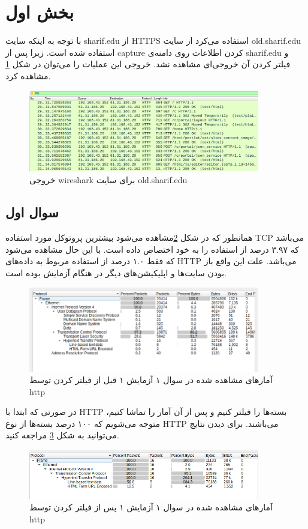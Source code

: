 \documentclass{article}
\begin{document}
\section{بخش اول}
با توجه به اینکه سایت sharif.edu از HTTPS استفاده می‌کرد از سایت old.sharif.edu استفاده شده است. زیرا پس از capture کردن اطلاعات روی دامنه‌ی sharif.edu و فیلتر کردن آن خروجی‌ای مشاهده نشد. خروجی این عملیات را می‌توان در شکل \ref{fig:result} مشاهده کرد.
\begin{figure}[h!]
	\centering
	\includegraphics[width=0.9\textwidth]{src/result.png}
	\caption{
خروجی wireshark برای سایت old.sharif.edu	
}
	\label{fig:result}
\end{figure}

\subsection{سوال اول}
همانطور که در شکل \ref{fig:stat}مشاهده می‌شود بیشترین پروتوکل مورد استفاده TCP می‌باشد که ۳.۹۷ درصد از استفاده را به خود اختصاص داده است. با این حال مشاهده می‌شود که فقط ۱.۰ درصد از استفاده مربوط به داده‌های HTTP می‌باشد. علت این واقع باز بودن سایت‌ها و اپلیکیشن‌های دیگر در هنگام آزمایش بوده است. 
\begin{figure}[h!]
	\centering
	\includegraphics[width=0.9\textwidth]{src/stat.png}
	\caption{آمار‌های مشاهده شده در سوال ۱ آزمایش ۱ قبل از فیلتر کردن توسط http}
	\label{fig:stat}
\end{figure}

در  صورتی که ابتدا با HTTP بسته‌ها را فیلتر کنیم و پس از آن آمار را تماشا کنیم، متوجه می‌شویم که ۱۰۰ درصد بسته‌ها از نوع HTTP می‌باشند. برای دیدن نتایج می‌توانید به شکل \ref{fig:stat2} مراجعه کنید.
\begin{figure}[h!]
	\centering
	\includegraphics[width=0.9\textwidth]{src/stat2.png}
	\caption{آمار‌های مشاهده شده در سوال ۱ آزمایش ۱ پس از فیلتر کردن توسط http}
	\label{fig:stat2}
\end{figure}
\end{document}

